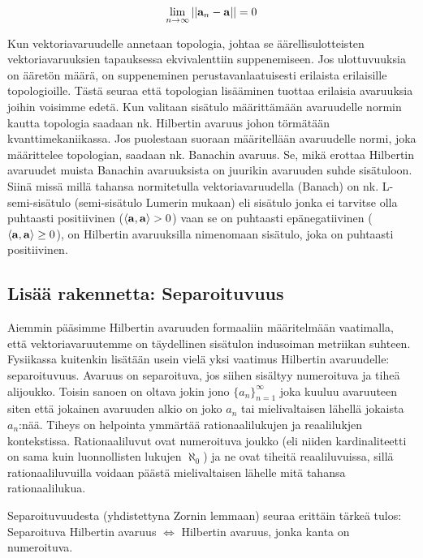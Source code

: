 \documentclass[../johdoksia.tex]{subfiles}
\begin{document}
	\begin{equation}
		\lim_{n\to\infty}||\mathbf{a}_n - \mathbf{a}|| = 0
	\end{equation}

	Kun vektoriavaruudelle annetaan topologia, johtaa se äärellisulotteisten vektoriavaruuksien tapauksessa ekvivalenttiin suppenemiseen. Jos ulottuvuuksia on ääretön määrä, on suppeneminen perustavanlaatuisesti erilaista erilaisille topologioille. Tästä seuraa että topologian lisääminen tuottaa erilaisia avaruuksia joihin voisimme edetä. Kun valitaan sisätulo määrittämään avaruudelle normin kautta topologia saadaan nk. Hilbertin avaruus johon törmätään kvanttimekaniikassa. Jos puolestaan suoraan määritellään avaruudelle normi, joka määrittelee topologian, saadaan nk. Banachin avaruus. Se, mikä erottaa Hilbertin avaruudet muista Banachin avaruuksista on juurikin avaruuden suhde sisätuloon. Siinä missä millä tahansa normitetulla vektoriavaruudella (Banach) on nk. L-semi-sisätulo (semi-sisätulo Lumerin mukaan) eli sisätulo jonka ei tarvitse olla puhtaasti positiivinen ($\langle\mathbf{a},\mathbf{a}\rangle > 0$) vaan se on puhtaasti epänegatiivinen ($\langle\mathbf{a},\mathbf{a}\rangle \geq 0$), on Hilbertin avaruuksilla nimenomaan sisätulo, joka on puhtaasti positiivinen.
	
	\subsection{Lisää rakennetta: Separoituvuus}
	
	Aiemmin pääsimme Hilbertin avaruuden formaaliin määritelmään vaatimalla, että vektoriavaruutemme on täydellinen sisätulon indusoiman metriikan suhteen. Fysiikassa kuitenkin lisätään usein vielä yksi vaatimus Hilbertin avaruudelle: separoituvuus. Avaruus on separoituva, jos siihen sisältyy numeroituva ja tiheä alijoukko. Toisin sanoen on oltava jokin jono $\{a_n\}_{n = 1}^{\infty}$ joka kuuluu avaruuteen siten että jokainen avaruuden alkio on joko $a_n$ tai mielivaltaisen lähellä jokaista $a_n$:nää. Tiheys on helpointa ymmärtää rationaalilukujen ja reaalilukjen kontekstissa. Rationaaliluvut ovat numeroituva joukko (eli niiden kardinaliteetti on sama kuin luonnollisten lukujen $\aleph_0$) ja ne ovat tiheitä reaaliluvuissa, sillä rationaaliluvuilla voidaan päästä mielivaltaisen lähelle mitä tahansa rationaalilukua.
	
	Separoituvuudesta (yhdistettyna Zornin lemmaan) seuraa erittäin tärkeä tulos: Separoituva Hilbertin avaruus $\iff$ Hilbertin avaruus, jonka kanta on numeroituva.
	
\end{document}
